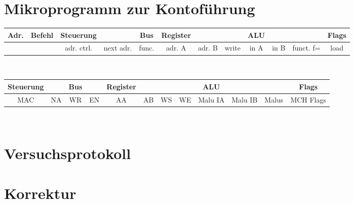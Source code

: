 \documentclass[paper=a4, fontsize=11pt]{scrartcl}
\numberwithin{equation}{section}
\numberwithin{figure}{section}
\numberwithin{table}{section}
\begin{document}

\newpage

\section{Mikroprogramm zur Kontoführung}

\begin{tabular}{|c|c|cc|c|ccc|ccc|c|}
\hline
Adr. & Befehl &Steuerung & & Bus & Register & & & ALU & & & Flags \\
\hline
& & adr. ctrl. & next adr. & func. & adr. A & adr. B & write & in A & in B & funct. f= & load \\
\hline
\end{tabular} \\

\begin{tabular}{|cc|cc|cccc|ccc|c|}
\hline
Steuerung & & Bus & & Register & & & & ALU & & & Flags \\
\hline
MAC & NA & WR & EN & AA & AB & WS & WE & Malu IA & Malu IB & Malus & MCH Flags \\
\hline
\end{tabular} \\


\newpage

\section{Versuchsprotokoll}


\newpage

\section{Korrektur}
\end{document}
